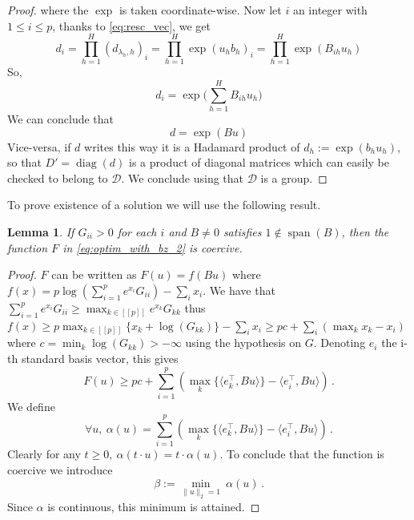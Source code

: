 \documentclass{article}
\theoremstyle{plain}
\newtheorem{lemma}[theorem]{Lemma}
\theoremstyle{definition}
\theoremstyle{remark}
\def\Dcal{\mathcal{D}}
\def\diag{\text{diag}}
\def\diag{\operatorname{diag}}
\def\Dcal{{\mathcal{D}}}
\newcommand{\integ}[1]{{[\![#1]\!]}}
\begin{document}
{\begin{proof}
where the $\exp$ is taken coordinate-wise. 
Now let $i$ an integer with $1 \leq i \leq p$, thanks to \eqref{eq:resc_vec}, we get
\begin{equation}
    d_i = \prod_{h=1}^H (d_{\lambda_h, h})_i = \prod_{h=1}^H \exp(u_h b_h)_i = \prod_{h=1}^H \exp(B_{ih} u_h)
\end{equation}
So, 
\begin{equation}
    d_i = \exp\big(\sum_{h=1}^H B_{ih} u_h\big)
\end{equation}
We can conclude that
\begin{equation}
    d = \exp(Bu)
\end{equation}
Vice-versa, if $d$ writes this way it is a Hadamard product of $d_{h} := \exp(b_{h}u_{h})$, so that $D' = \diag(d)$ is a product of diagonal matrices which can easily be checked to belong to $\Dcal$. We conclude using that $\Dcal$ is a group.
\end{proof}
To prove existence of a solution we will use the following result.
\begin{lemma}
\label{lemma:coercive_property}
If $G_{ii} > 0$ for each $i$ and $B \neq 0$ satisfies $1 \not\in \operatorname{span}(B)$, then the function $F$ in \eqref{eq:optim_with_bz_2} is coercive.
\end{lemma}
\begin{proof}
$F$ can be written as $F(u) = f(Bu)$ where $f(x) = p \log(\sum_{i=1}^{p} e^{x_i} G_{ii}) - \sum_i x_i$.
We have that $\sum_{i=1}^{p} e^{x_i} G_{ii} \geq \max_{k \in \integ{p}} e^{x_k} G_{kk}$ thus 
$f(x) \geq p \max_{k \in \integ{p}} \{x_k + \log(G_{kk})\} - \sum_{i} x_i \geq p c  + \sum_i(\max_k x_k - x_i)$ 
where $c = \min_{k} \log(G_{kk})>-\infty$ using the hypothesis on $G$.
Denoting $e_i$ the i-th standard basis vector, this gives
\begin{equation}
\label{eq:bound_on_f}
F(u) \geq p c + \sum_{i=1}^{p} \left(\max_{k}\{\langle e_k^\top, B u\rangle\} - \langle e_i^\top, Bu\rangle\right)\,.
\end{equation}
We define
\begin{equation}
\forall u, \ \alpha(u) = \sum_{i=1}^{p} \left(\max_{k}\{\langle e_k^\top, B u\rangle\} - \langle e_i^\top, Bu\rangle \right)\,.
\end{equation}
Clearly for any $t \geq 0, \ \alpha(t\cdot u) = t\cdot \alpha(u)$.
To conclude that the function is coercive we introduce
\begin{equation}
\beta := \min_{\|u\|_2 = 1} \ \alpha(u)\,.
\end{equation}
Since $\alpha$ is continuous, this minimum is attained.

\end{proof}}
\end{document}

